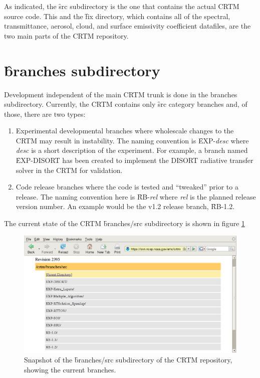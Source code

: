 As indicated, the \f{src} subdirectory is the one that contains the actual CRTM source code. This and the \f{fix}
directory, which contains all of the spectral, transmittance, aerosol, cloud, and surface emissivity coefficient datafiles, are the two main parts of the CRTM repository.


\section{\f{branches} subdirectory}
Development independent of the main CRTM trunk is done in the branches subdirectory. Currently, the CRTM contains only \f{src} category branches and, of those, there are two types:
\begin{enumerate}
  \item Experimental developmental branches where wholescale changes to the CRTM may result in instability. The naming convention is \f{EXP-}\textit{desc} where \textit{desc} is a short description of the experiment. For example, a branch named \f{EXP-DISORT} has been created to implement the DISORT radiative transfer solver in the CRTM for validation. 
  \item Code release branches where the code is tested and ``tweaked'' prior to a release. The naming convention here is \f{RB-}\textit{rel} where \textit{rel} is the planned release version number. An example would be the v1.2 release branch, \f{RB-1.2}.
\end{enumerate}
The current state of the CRTM \f{branches/src} subdirectory is shown in figure \ref{fig:branches_src_repository}
\begin{figure}[htb]
  \centering
  \includegraphics[scale=0.5]{graphics/branches_src_repository.eps}
  \caption{Snapshot of the \f{branches/src} subdirectory of the CRTM repository, showing the current branches.}
  \label{fig:branches_src_repository}
\end{figure}


